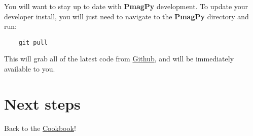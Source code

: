 \documentclass[11pt]{article}
\begin{document}
    You will want to stay up to date with {\bf PmagPy} development.  To update your developer install, you will just need to navigate to the {\bf PmagPy} directory and run:

\begin{verbatim}
    git pull
\end{verbatim}

This will grab all of the latest code from \href{https://github.com/PmagPy/PmagPy}{Github}, and will be immediately available to you.

\section{Next steps}

Back to the \href{https://earthref.org/PmagPy/cookbook/#next_steps}{Cookbook}!
\end{document}

